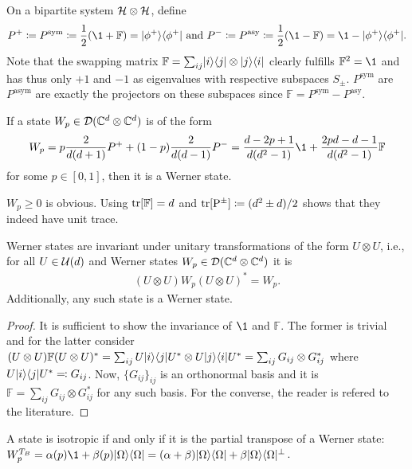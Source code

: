 On a bipartite system $\mathcal{H} \otimes \mathcal{H}$, define
    \begin{align}
        P^+\coloneqq P^\text{sym}\coloneqq \frac{1}{2}(\1+\mathbb F)=\pr{\phi^+} \text{ and }P^- \coloneqq P^\text{asy}\coloneqq \frac{1}{2}(\1-\mathbb F)=\1-\pr{\phi^+}. 
    \end{align}
Note that the swapping matrix $\mathbb F = \sum_{ij}\lvert i\rangle\langle j\rvert\otimes \lvert j\rangle \langle i\rvert$ clearly fulfills $\mathbb F^2 = \1$ and has thus only $+1$ and $-1$ as eigenvalues with respective subspaces $S_\pm$. $P^\text{sym}$ are $P^\text{asym}$ are exactly the projectors on these subspaces since $\mathbb  F = P^\text{sym}-P^\text{asy}$.
\begin{definition}
    If a state $W_p \in \mathcal D(\mathbb{C}^d \otimes \mathbb{C}^d)$ is of the form 
    \begin{align*}
        W_p= p \frac{2}{d(d+1)}P^+ + (1-p)\frac{2}{d(d-1)}P^- = \frac{d-2p+1}{d(d^2-1)}\1 + \frac{2pd-d-1}{d(d^2-1)}\mathbb F
    \end{align*}
    for some $p\in[0,1]$, then it is a Werner state.
\end{definition}\noindent
$W_p \geq 0$ is obvious. Using $\mathrm{tr[\mathbb F]} = d$ and $\mathrm{tr[P^\pm]}\coloneqq (d^2\pm d)/2$ shows that they indeed have unit trace.
\begin{lemma} Werner states are invariant under unitary transformations of the form $U\otimes U$, i.e., for all $U \in \mathcal U(d)$ and Werner states $W_p \in \mathcal D(\mathbb{C}^d \otimes \mathbb{C}^d)$ it is 
\begin{align*}
    (U\otimes U)W_p (U\otimes U)^* = W_p.
\end{align*}
Additionally, any such state is a Werner state.
\end{lemma}
\begin{proof}
    It is sufficient to show the invariance of $\1$ and $\mathbb F$. The former is trivial and for the latter consider $
        (U\otimes U)\mathbb F(U\otimes U)^* = \sum_{ij}U\lvert i\rangle \langle j\rvert U^* \otimes U\lvert j\rangle \langle i\rvert U^* = \sum_{ij}G_{ij}\otimes G_{ij}^*$ where $U\lvert i\rangle \langle j\rvert U^*\eqqcolon G_{ij}$. Now, $\{G_{ij}\}_{ij}$ is an orthonormal basis and it is $\mathbb F = \sum_{ij}G_{ij}\otimes G_{ij}^*$ for any such basis. For the converse, the reader is refered to the literature.
\end{proof}
\begin{lemma}
    A state is isotropic if and only if it is the partial transpose of a Werner state: $W_p^{T_B} = \alpha(p)\1 + \beta(p)\pr \Omega = (\alpha + \beta)\pr \Omega + \beta \pr \Omega^\perp$.
\end{lemma}
